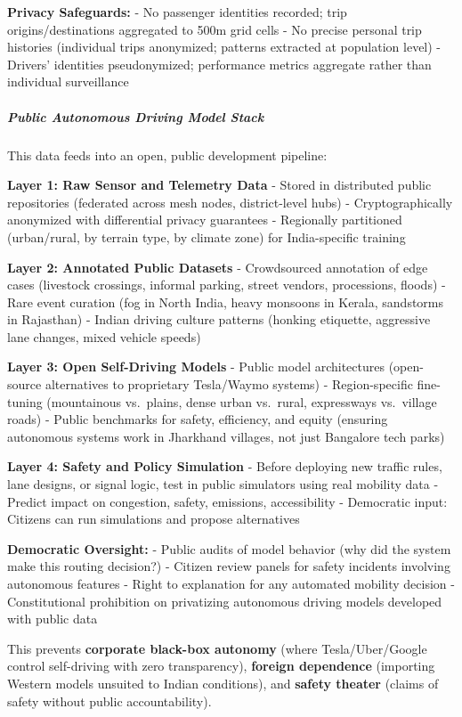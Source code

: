 \textbf{Privacy Safeguards:} - No passenger identities recorded; trip
origins/destinations aggregated to 500m grid cells - No precise personal
trip histories (individual trips anonymized; patterns extracted at
population level) - Drivers' identities pseudonymized; performance
metrics aggregate rather than individual surveillance

\subparagraph{Public Autonomous Driving Model
Stack}\label{public-autonomous-driving-model-stack}

This data feeds into an open, public development pipeline:

\textbf{Layer 1: Raw Sensor and Telemetry Data} - Stored in distributed
public repositories (federated across mesh nodes, district-level hubs) -
Cryptographically anonymized with differential privacy guarantees -
Regionally partitioned (urban/rural, by terrain type, by climate zone)
for India-specific training

\textbf{Layer 2: Annotated Public Datasets} - Crowdsourced annotation of
edge cases (livestock crossings, informal parking, street vendors,
processions, floods) - Rare event curation (fog in North India, heavy
monsoons in Kerala, sandstorms in Rajasthan) - Indian driving culture
patterns (honking etiquette, aggressive lane changes, mixed vehicle
speeds)

\textbf{Layer 3: Open Self-Driving Models} - Public model architectures
(open-source alternatives to proprietary Tesla/Waymo systems) -
Region-specific fine-tuning (mountainous vs.~plains, dense urban
vs.~rural, expressways vs.~village roads) - Public benchmarks for
safety, efficiency, and equity (ensuring autonomous systems work in
Jharkhand villages, not just Bangalore tech parks)

\textbf{Layer 4: Safety and Policy Simulation} - Before deploying new
traffic rules, lane designs, or signal logic, test in public simulators
using real mobility data - Predict impact on congestion, safety,
emissions, accessibility - Democratic input: Citizens can run
simulations and propose alternatives

\textbf{Democratic Oversight:} - Public audits of model behavior (why
did the system make this routing decision?) - Citizen review panels for
safety incidents involving autonomous features - Right to explanation
for any automated mobility decision - Constitutional prohibition on
privatizing autonomous driving models developed with public data

This prevents \textbf{corporate black-box autonomy} (where
Tesla/Uber/Google control self-driving with zero transparency),
\textbf{foreign dependence} (importing Western models unsuited to Indian
conditions), and \textbf{safety theater} (claims of safety without
public accountability).


